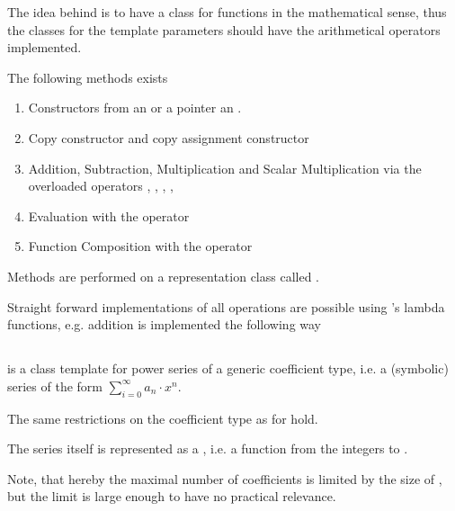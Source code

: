       The idea behind \func is to have a class for functions in the mathematical sense, thus the classes for the template
			parameters should have the arithmetical operators implemented.

			The following methods exists
			\begin{enumerate}
				\item Constructors from an  or a pointer an .
				\item  Copy constructor  and copy assignment constructor 
				\item Addition, Subtraction, Multiplication and Scalar Multiplication via the overloaded operators \code{+}, \code{-}, 	\code{*}, \code{+=}, \code{*=}
				\item Evaluation with the operator \code{()}
				\item Function Composition with the operator \code{()}
			\end{enumerate}
			Methods are performed on a representation class called .
      
      Straight forward implementations of all operations are possible using {\ccx}'s lambda functions, e.g. addition is implemented the following way
			
		\subsection{\powerseries}
			\textbf{} is a class template for power series of a generic coefficient type, 
			i.e. a (symbolic) series of the form $ \sum_{i=0}^\infty a_n \cdot x^n$.

			The same restrictions on the coefficient type as for \poly hold.
			
			The series itself is represented as a , i.e. a function from the integers to .
      
      Note, that hereby the maximal number of coefficients is limited by the size of , 
			but the limit is large enough to have no practical relevance.   

